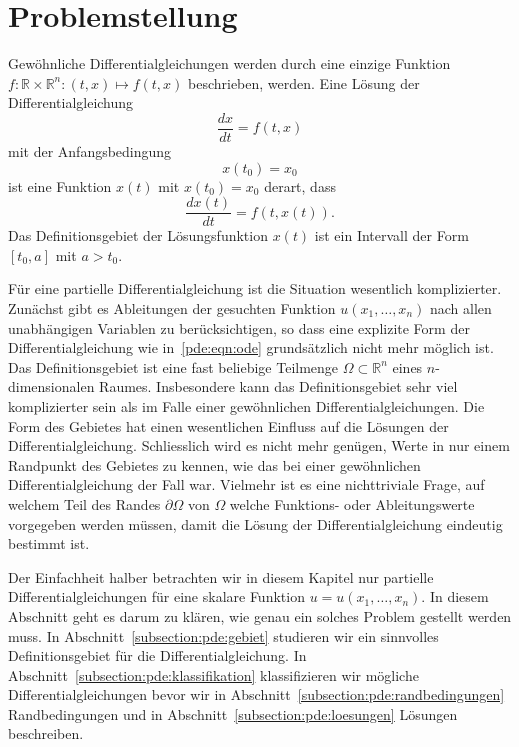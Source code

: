 %
%
%
\section{Problemstellung
\label{section:pde:problem}}
Gewöhnliche Differentialgleichungen werden durch eine einzige Funktion
$f\colon \mathbb R\times\mathbb R^n: (t,x)\mapsto f(t,x)$ beschrieben,
werden.
Eine Lösung der Differentialgleichung
\begin{equation}
\frac{dx}{dt} = f(t,x)
\label{pde:eqn:ode}
\end{equation}
mit der Anfangsbedingung
\[
x(t_0) = x_0
\]
ist eine Funktion $x(t)$ mit $x(t_0)=x_0$ derart, dass 
\[
\frac{dx(t)}{dt} = f(t, x(t)).
\]
Das Definitionsgebiet der Lösungsfunktion $x(t)$ ist ein Intervall
der Form $[t_0,a]$ mit $a>t_0$.

Für eine partielle Differentialgleichung ist die Situation wesentlich
komplizierter.
Zunächst gibt es Ableitungen der gesuchten Funktion $u(x_1,\dots,x_n)$
nach allen unabhängigen Variablen zu
berücksichtigen, so dass eine explizite Form der Differentialgleichung
wie in~\eqref{pde:eqn:ode} grundsätzlich nicht mehr möglich ist.
Das Definitionsgebiet ist eine fast beliebige Teilmenge
$\Omega\subset\mathbb R^n$ eines $n$-dimensionalen Raumes.
Insbesondere kann das Definitionsgebiet sehr viel komplizierter sein
als im Falle einer gewöhnlichen Differentialgleichungen.
Die Form des Gebietes hat einen wesentlichen Einfluss auf die Lösungen
der Differentialgleichung.
Schliesslich wird es nicht mehr genügen, Werte in nur einem Randpunkt
des Gebietes zu kennen, wie das bei einer gewöhnlichen Differentialgleichung
der Fall war.
Vielmehr ist es eine nichttriviale Frage, auf welchem Teil des Randes
$\partial\Omega$ von $\Omega$ welche Funktions- oder Ableitungswerte
vorgegeben werden müssen, damit die Lösung der Differentialgleichung
eindeutig bestimmt ist.

Der Einfachheit halber betrachten wir in diesem Kapitel nur partielle
Differentialgleichungen für eine skalare Funktion $u=u(x_1,\dots,x_n)$.
In diesem Abschnitt geht es darum zu klären, wie genau ein solches
Problem gestellt werden muss.
In Abschnitt~\ref{subsection:pde:gebiet} studieren wir ein sinnvolles
Definitionsgebiet für die Differentialgleichung.
In Abschnitt~\ref{subsection:pde:klassifikation} klassifizieren wir
mögliche Differentialgleichungen bevor wir in
Abschnitt~\ref{subsection:pde:randbedingungen} Randbedingungen und
in Abschnitt~\ref{subsection:pde:loesungen} Lösungen beschreiben.

